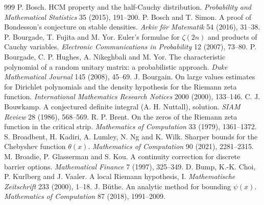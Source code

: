 \begin{thebibliography}{999}
 P. Bosch. HCM property and the half-Cauchy distribution. \emph{Probability and Mathematical Statistics} 35 (2015), 191--200.
 P. Bosch and T. Simon. A proof of Bondesson's conjecture on stable densities. \emph{Arkiv f\"or Matematik} 54 (2016), 31--38.
 P. Bourgade, T. Fujita and M. Yor. Euler's formulae for $\zeta(2n)$ and products of Cauchy variables. \emph{Electronic Communications in Probability} 12 (2007), 73--80.
 P. Bourgade, C. P. Hughes, A. Nikeghbali and M. Yor. The characteristic polynomial of a random unitary matrix: a probabilistic approach. \emph{Duke Mathematical Journal} 145 (2008), 45--69.
 J. Bourgain. On large values estimates for Dirichlet polynomials and the density hypothesis for the Riemann zeta function. \emph{International Mathematics Research Notices} 2000 (2000), 133--146.
 C. J. Bouwkamp. A conjectured definite integral (A. H. Nuttall), solution. \emph{SIAM Review} 28 (1986), 568--569.
 R. P. Brent. On the zeros of the Riemann zeta function in the critical strip. \emph{Mathematics of Computation} 33 (1979), 1361--1372.
 S. Broadbent, H. Kadiri, A. Lumley, N. Ng and K. Wilk. Sharper bounds for the Chebyshev function $\theta(x)$. \emph{Mathematics of Computation} 90 (2021), 2281--2315.
 M. Broadie, P. Glasserman and S. Kou. A continuity correction for discrete barrier options. \emph{Mathematical Finance} 7 (1997), 325--349.
 D. Bump, K.-K. Choi, P. Kurlberg and J. Vaaler. A local Riemann hypothesis, I. \emph{Mathematische Zeitschrift} 233 (2000), 1--18.
 J. B\"uthe. An analytic method for bounding $\psi(x)$. \emph{Mathematics of Computation} 87 (2018), 1991--2009.

\end{thebibliography}
